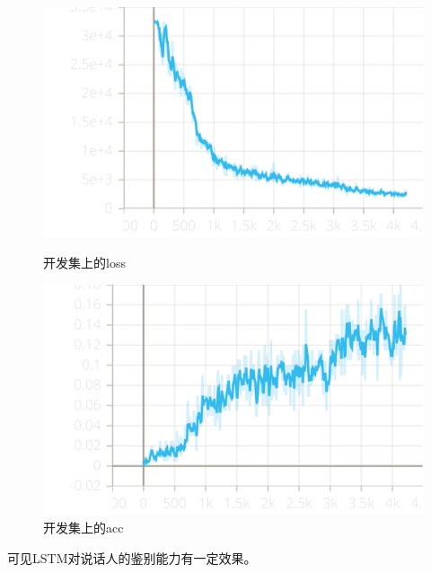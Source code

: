 \documentclass{article}
\begin{document}
\begin{figure}[H]
    \begin{minipage}[H]{0.5\linewidth}
        \centering
        \includegraphics[width=\textwidth]{figures/loss_train.png}
        \caption{开发集上的loss}
    \end{minipage}
    \begin{minipage}[H]{0.5\linewidth}
        \centering
        \includegraphics[width=\textwidth]{figures/acc_dev.png}
        \caption{开发集上的acc}
    \end{minipage}
    \label{dev}
\end{figure}

可见LSTM对说话人的鉴别能力有一定效果。



\end{document}
